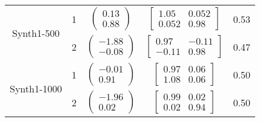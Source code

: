 \documentclass[10pt]{article}
\begin{document}
\begin{center}
\begin{tabular}{ | c | c | c | c | c |}
			\hline
			\hline
			\multirow{2}{*}{Synth1-500}        &   1&       $\begin{pmatrix} 0.13\\0.88 \end{pmatrix}$            &         	$\begin{bmatrix} 1.05 & 0.052 \\ 0.052 & 0.98 \end{bmatrix}$             & 			0.53		\\\cline{2-5}
			        											&   2&         $\begin{pmatrix} -1.88\\-0.08 \end{pmatrix}$         &  
			        											$\begin{bmatrix} 0.97 & -0.11 \\ -0.11 & 0.98 \end{bmatrix}$                      & 		0.47		\\
		
			\hline
			\hline
			\multirow{2}{*}{Synth1-1000}         &   1&   $\begin{pmatrix} -0.01\\0.91 \end{pmatrix}$           &        	$\begin{bmatrix} 0.97 & 0.06  \\ 1.08 & 0.06 \end{bmatrix}$          & 		0.50		\\\cline{2-5}
			         										&   2&       $\begin{pmatrix} -1.96\\0.02 \end{pmatrix}$            &    $\begin{bmatrix} 0.99 & 0.02 \\0.02 & 0.94 \end{bmatrix}$                  & 	0.50				\\
			\hline
			\hline
			\end{tabular}
		\end{center}
	
\end{document}
